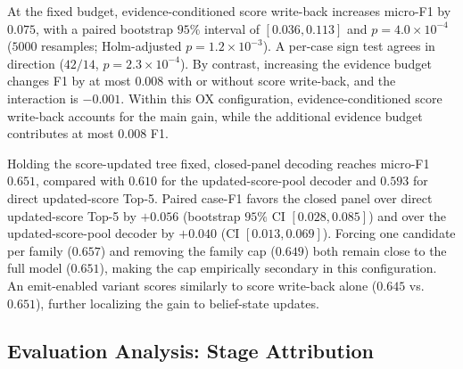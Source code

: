 \documentclass[letterpaper]{article} %
\begin{document}
At the fixed budget, evidence-conditioned score write-back increases micro-F1 by $0.075$, with a paired bootstrap $95\%$ interval of $[0.036,0.113]$ and $p=4.0{\times}10^{-4}$ ($5000$ resamples; Holm-adjusted $p=1.2{\times}10^{-3}$).
A per-case sign test agrees in direction ($42/14$, $p=2.3{\times}10^{-4}$).
By contrast, increasing the evidence budget changes F1 by at most $0.008$ with or without score write-back, and the interaction is $-0.001$.
Within this OX configuration, evidence-conditioned score write-back accounts for the main gain, while the additional evidence budget contributes at most $0.008$ F1.

Holding the score-updated tree fixed, closed-panel decoding reaches micro-F1 $0.651$, compared with $0.610$ for the updated-score-pool decoder and $0.593$ for direct updated-score Top-5.
Paired case-F1 favors the closed panel over direct updated-score Top-5 by $+0.056$ (bootstrap $95\%$ CI $[0.028,0.085]$) and over the updated-score-pool decoder by $+0.040$ (CI $[0.013,0.069]$).
Forcing one candidate per family ($0.657$) and removing the family cap ($0.649$) both remain close to the full model ($0.651$), making the cap empirically secondary in this configuration.
An emit-enabled variant scores similarly to score write-back alone ($0.645$ vs.\ $0.651$), further localizing the gain to belief-state updates.

\subsection{Evaluation Analysis: Stage Attribution}
\label{sec:res-tax}
\end{document}
